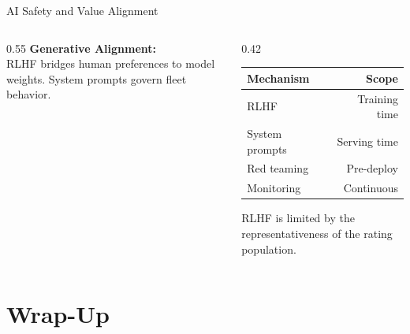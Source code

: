 \documentclass[aspectratio=169, 12pt]{beamer}
\begin{document}
\begin{frame}{AI Safety and Value Alignment}
\begin{columns}[T]
\begin{column}{0.55\textwidth}
    \vspace{0.1cm}
    \textbf{Generative Alignment:}\\
    {\scriptsize RLHF bridges human preferences to model weights. System prompts govern fleet behavior.}
  \end{column}
  \begin{column}{0.42\textwidth}
    \renewcommand{\arraystretch}{1.1}
    {\scriptsize
    \begin{tabular}{@{}lr@{}}
      \toprule
      \textbf{Mechanism} & \textbf{Scope} \\
      \midrule
      RLHF          & Training time \\
      System prompts & Serving time \\
      Red teaming    & Pre-deploy \\
      Monitoring     & Continuous \\
      \bottomrule
    \end{tabular}
    }

    \vspace{0.1cm}
    {\scriptsize\textcolor{midgray}{RLHF is limited by the representativeness of the rating population.}}
  \end{column}
\end{columns}

\end{frame}

\section{Wrap-Up}
\end{document}
